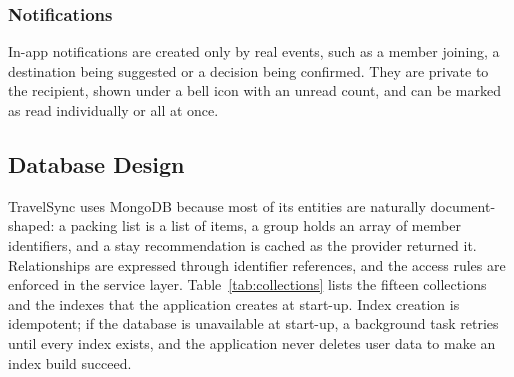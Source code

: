 \subsubsection{Notifications}

In-app notifications are created only by real events, such as a member
joining, a destination being suggested or a decision being confirmed. They
are private to the recipient, shown under a bell icon with an unread count,
and can be marked as read individually or all at once.

\subsection{Database Design}
\label{sec:database-design}

TravelSync uses MongoDB because most of its entities are naturally
document-shaped: a packing list is a list of items, a group holds an array of
member identifiers, and a stay recommendation is cached as the provider
returned it. Relationships are expressed through identifier references, and
the access rules are enforced in the service layer. Table~\ref{tab:collections}
lists the fifteen collections and the indexes that the application creates
at start-up. Index creation is idempotent; if the database is unavailable at
start-up, a background task retries until every index exists, and the
application never deletes user data to make an index build succeed.

